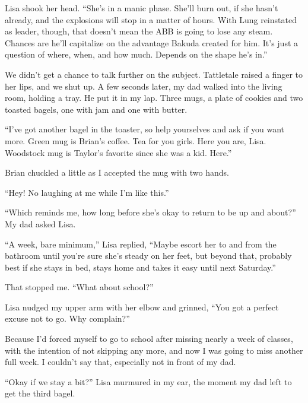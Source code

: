 Lisa shook her head.  ``She's in a manic phase.  She'll burn out, if she hasn't already, and the explosions will stop in a matter of hours.  With Lung reinstated as leader, though, that doesn't mean the ABB is going to lose any steam.  Chances are he'll capitalize on the advantage Bakuda created for him.  It's just a question of where, when, and how much.  Depends on the shape he's in.''



We didn't get a chance to talk further on the subject.  Tattletale raised a finger to her lips, and we shut up.  A few seconds later, my dad walked into the living room, holding a tray.  He put it in my lap.  Three mugs, a plate of cookies and two toasted bagels, one with jam and one with butter.



``I've got another bagel in the toaster, so help yourselves and ask if you want more.  Green mug is Brian's coffee.  Tea for you girls.  Here you are, Lisa.  Woodstock mug is Taylor's favorite since she was a kid.  Here.''



Brian chuckled a little as I accepted the mug with two hands.



``Hey!  No laughing at me while I'm like this.''



``Which reminds me, how long before she's okay to return to be up and about?'' My dad asked Lisa.



``A week, bare minimum,'' Lisa replied, ``Maybe escort her to and from the bathroom until you're sure she's steady on her feet, but beyond that, probably best if she stays in bed, stays home and takes it easy until next Saturday.''



That stopped me.  ``What about school?''



Lisa nudged my upper arm with her elbow and grinned, ``You got a perfect excuse not to go.  Why complain?''



Because I'd forced myself to go to school after missing nearly a week of classes, with the intention of not skipping any more, and now I was going to miss another full week.  I couldn't say that, especially not in front of my dad.



``Okay if we stay a bit?'' Lisa murmured in my ear, the moment my dad left to get the third bagel.



